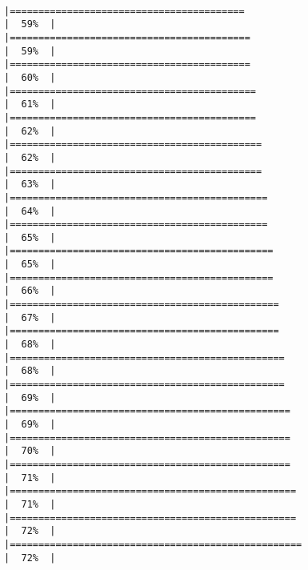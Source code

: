 \documentclass[
]{article}
\begin{document}
\begin{verbatim}
                                                   |=========================================                             |  59%  |                                                                              |==========================================                            |  59%  |                                                                              |==========================================                            |  60%  |                                                                              |===========================================                           |  61%  |                                                                              |===========================================                           |  62%  |                                                                              |============================================                          |  62%  |                                                                              |============================================                          |  63%  |                                                                              |=============================================                         |  64%  |                                                                              |=============================================                         |  65%  |                                                                              |==============================================                        |  65%  |                                                                              |==============================================                        |  66%  |                                                                              |===============================================                       |  67%  |                                                                              |===============================================                       |  68%  |                                                                              |================================================                      |  68%  |                                                                              |================================================                      |  69%  |                                                                              |=================================================                     |  69%  |                                                                              |=================================================                     |  70%  |                                                                              |=================================================                     |  71%  |                                                                              |==================================================                    |  71%  |                                                                              |==================================================                    |  72%  |                                                                              |===================================================                   |  72%  |                            
\end{verbatim}
\end{document}

